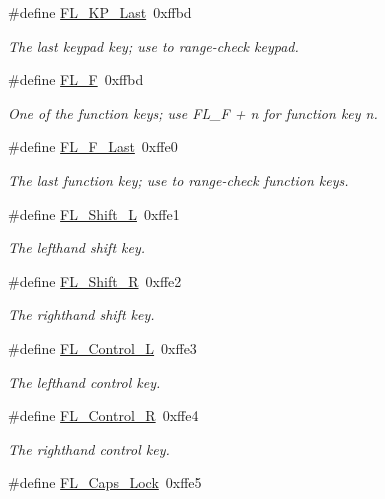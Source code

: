 \begin{Indent}
\begin{DoxyCompactItemize}
\#define \hyperlink{_enumerations_8_h_a14fb705c31fdb8357ae4f3718e20a018}{F\+L\+\_\+\+K\+P\+\_\+\+Last}~0xffbd
\begin{DoxyCompactList}\small\item\em The last keypad key; use to range-\/check keypad. \end{DoxyCompactList}\item 
\#define \hyperlink{_enumerations_8_h_ae793aa65307884c2ad99893508d844f2}{F\+L\+\_\+F}~0xffbd
\begin{DoxyCompactList}\small\item\em One of the function keys; use F\+L\+\_\+F + n for function key n. \end{DoxyCompactList}\item 
\#define \hyperlink{_enumerations_8_h_a104d0fea5c26197d28294d319dd93af3}{F\+L\+\_\+\+F\+\_\+\+Last}~0xffe0
\begin{DoxyCompactList}\small\item\em The last function key; use to range-\/check function keys. \end{DoxyCompactList}\item 
\#define \hyperlink{_enumerations_8_h_ab81acb8d22583da65645c45cb2da1bed}{F\+L\+\_\+\+Shift\+\_\+L}~0xffe1
\begin{DoxyCompactList}\small\item\em The lefthand shift key. \end{DoxyCompactList}\item 
\#define \hyperlink{_enumerations_8_h_a223901295f3b3157bd082a772f20da77}{F\+L\+\_\+\+Shift\+\_\+R}~0xffe2
\begin{DoxyCompactList}\small\item\em The righthand shift key. \end{DoxyCompactList}\item 
\#define \hyperlink{_enumerations_8_h_adefca9b73c422d3dadf3fa555d1fb913}{F\+L\+\_\+\+Control\+\_\+L}~0xffe3
\begin{DoxyCompactList}\small\item\em The lefthand control key. \end{DoxyCompactList}\item 
\#define \hyperlink{_enumerations_8_h_aecba53654154e1c0b22351106636ea79}{F\+L\+\_\+\+Control\+\_\+R}~0xffe4
\begin{DoxyCompactList}\small\item\em The righthand control key. \end{DoxyCompactList}\item 
\#define \hyperlink{_enumerations_8_h_a55c0fc2c4fdd81b243e9036b536484e3}{F\+L\+\_\+\+Caps\+\_\+\+Lock}~0xffe5

\end{DoxyCompactItemize}
\end{Indent}
